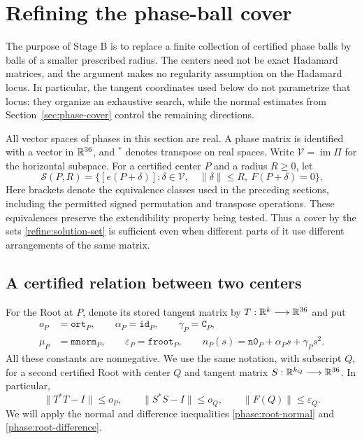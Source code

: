 \section{Refining the phase-ball cover}\label{sec:refinement}

The purpose of Stage B is to replace a finite collection of certified
phase balls by balls of a smaller prescribed radius.  The centers need
not be exact Hadamard matrices, and the argument makes no regularity
assumption on the Hadamard locus.  In particular, the tangent coordinates
used below do not parametrize that locus: they organize an exhaustive
search, while the normal estimates from Section~\ref{sec:phase-cover}
control the remaining directions.

All vector spaces of phases in this section are real.  A phase matrix is
identified with a vector in $\mathbb R^{36}$, and $^*$ denotes transpose on real
spaces.  Write $\mathcal V=\operatorname{im}\Pi$ for the horizontal
subspace.  For a certified center $P$ and a radius $R\geq0$, let
\begin{equation}\label{refine:solution-set}
 \mathcal S(P,R)=
 \bigl\{[e(P+\delta)]:\delta\in\mathcal V,\quad
       \|\delta\|\leq R,\ F(P+\delta)=0\bigr\}.
\end{equation}
Here brackets denote the equivalence classes used in the preceding
sections, including the permitted signed permutation and transpose
operations.  These equivalences preserve the extendibility property
being tested.  Thus a cover by the sets \eqref{refine:solution-set} is
sufficient even when different parts of it use different arrangements
of the same matrix.

\subsection{A certified relation between two centers}

For the Root at $P$, denote its stored tangent matrix by
$T:\mathbb R^k\longrightarrow\mathbb R^{36}$ and put
\begin{equation}\label{refine:constants}
 \begin{split}
 o_P&=\mathtt{ort}_P,\qquad
 \alpha_P=\mathtt{id}_P,\qquad \gamma_P=\mathtt C_P,\\
 \mu_P&=\mathtt{mnorm}_P,\qquad
 \varepsilon_P=\mathtt{froot}_P,\qquad
 n_P(s)=\mathtt{n0}_P+\alpha_Ps+\gamma_Ps^2.
 \end{split}
\end{equation}
All these constants are nonnegative.  We use the same notation, with
subscript $Q$, for a second certified Root with center $Q$ and tangent
matrix $S:\mathbb R^{k_Q}\longrightarrow\mathbb R^{36}$.  In particular,
\begin{equation}\label{refine:gram-bounds}
 \|T^*T-I\|\leq o_P,
 \qquad \|S^*S-I\|\leq o_Q,
 \qquad \|F(Q)\|\leq\varepsilon_Q.
\end{equation}
We will apply the normal and difference inequalities
\eqref{phase:root-normal} and \eqref{phase:root-difference}.


